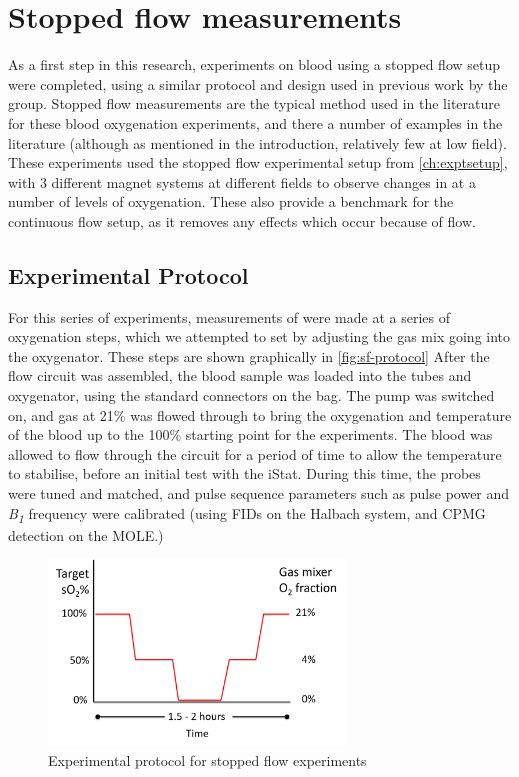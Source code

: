 \chapter{Stopped flow \SOtwo measurements}\label{ch:stoppedflow}

As a first step in this research, experiments on blood using a stopped flow setup were completed, using a similar protocol and design used in previous work by the group.
Stopped flow measurements are the typical method used in the literature for these blood oxygenation \Ttwo experiments, and there a number of examples in the literature \cite{BrooksComparisont2relaxation1995,BryantMagneticrelaxationblood1990,GomoriNMRRelaxationTimes1987} (although as mentioned in the introduction, relatively few at low field).
These experiments used the stopped flow experimental setup from \autoref{ch:exptsetup}, with 3 different magnet systems at different fields to observe changes in \Ttwo at a number of levels of oxygenation.
These also provide a benchmark for the continuous flow setup, as it removes any effects which occur because of flow.

\section{Experimental Protocol}
For this series of experiments, measurements of \Ttwo were made at a series of oxygenation steps, which we attempted to set by adjusting the gas mix going into the oxygenator.
These steps are shown graphically in \autoref{fig:sf-protocol}
After the flow circuit was assembled, the blood sample was loaded into the tubes and oxygenator, using the standard connectors on the bag.
The pump was switched on, and gas at 21\% \Otwo was flowed through to bring the oxygenation and temperature of the blood up to the 100\% starting point for the experiments.
The blood was allowed to flow through the circuit for a period of time to allow the temperature to stabilise, before an initial test with the iStat.
During this time, the probes were tuned and matched, and pulse sequence parameters such as pulse power and \textit{B\textsubscript{1}} frequency were calibrated (using FIDs on the Halbach system, and CPMG detection on the MOLE.)
\begin{figure}[t]
\centering
\includegraphics[width=0.7\textwidth]{figures/stoppedflow/stoppedflowprotocol.png}
\caption{Experimental protocol for stopped flow experiments}
\label{fig:sf-protocol}
\end{figure}


